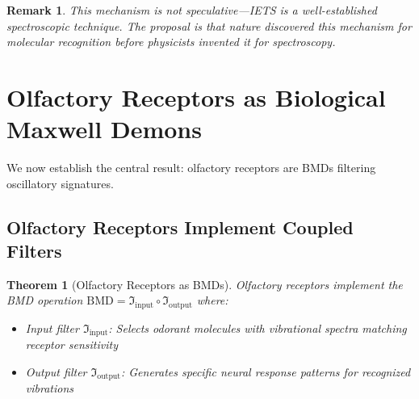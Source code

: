 \documentclass[12pt,a4paper]{article}
\newtheorem{theorem}{Theorem}
\newtheorem{remark}{Remark}
\begin{document}
\begin{remark}
This mechanism is not speculative—IETS is a well-established spectroscopic technique. The proposal is that nature discovered this mechanism for molecular recognition before physicists invented it for spectroscopy.
\end{remark}

\section{Olfactory Receptors as Biological Maxwell Demons}

We now establish the central result: olfactory receptors are BMDs filtering oscillatory signatures.

\subsection{Olfactory Receptors Implement Coupled Filters}

\begin{theorem}[Olfactory Receptors as BMDs]
\label{thm:olfactory_bmd}
Olfactory receptors implement the BMD operation $\text{BMD} = \Im_{\text{input}} \circ \Im_{\text{output}}$ where:
\begin{itemize}
\item Input filter $\Im_{\text{input}}$: Selects odorant molecules with vibrational spectra matching receptor sensitivity
\item Output filter $\Im_{\text{output}}$: Generates specific neural response patterns for recognized vibrations
\end{itemize}
\end{theorem}
\end{document}
